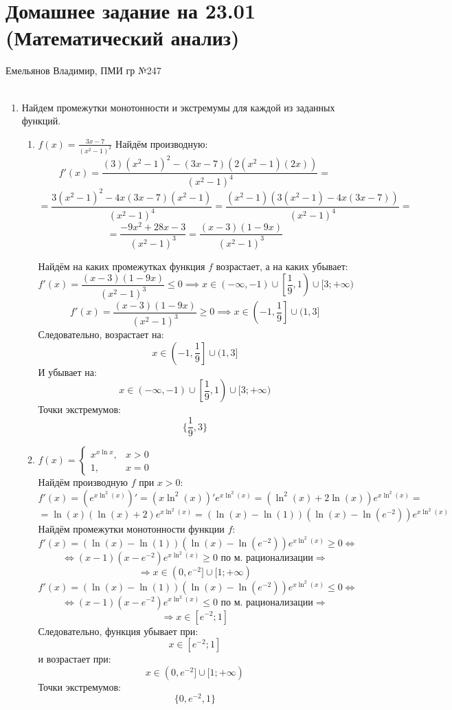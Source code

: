\documentclass[a4paper]{article}
\renewcommand{\f}[2]{\frac{#1}{#2}}
\newcommand{\lr}{\Leftrightarrow}
\renewcommand{\r}{\Rightarrow}
\renewcommand{\geq}{\geqslant}
\renewcommand{\leq}{\leqslant}
\begin{document}
\section*{Домашнее задание на 23.01 (Математический анализ)}
 {\large Емельянов Владимир, ПМИ гр №247}\\\\
\begin{enumerate}
    \item[\textbf{№1}]Найдем промежутки монотонности и экстремумы для каждой из заданных функций.
    \begin{enumerate}
        \item[(a)]$ f(x) = \frac{3x - 7}{(x^2 - 1)^2} $
        Найдём производную:
        $$
        f'(x) = \frac{(3)(x^2 - 1)^2 - (3x - 7)(2(x^2 - 1)(2x))}{(x^2 - 1)^4} =
        $$
        $$
        = \frac{3(x^2 - 1)^2 - 4x(3x - 7)(x^2 - 1)}{(x^2 - 1)^4} = \frac{(x^2 - 1)(3(x^2 - 1) - 4x(3x - 7))}{(x^2 - 1)^4} =
        $$
        $$
        =\frac{-9x^2 +28x-3}{(x^2 - 1)^3} = \frac{(x-3)(1-9x)}{(x^2 - 1)^3}
        $$

        Найдём на каких промежутках функция $f$ возрастает, а на каких убывает:
        $$
        f'(x) = \frac{(x-3)(1-9x)}{(x^2 - 1)^3} \leq 0 \implies  x \in (-\infty, -1) \cup \left[\frac{1}{9}, 1\right) \cup [3;+\infty)
        $$
        $$
        f'(x) = \frac{(x-3)(1-9x)}{(x^2 - 1)^3} \geq 0 \implies x \in \left(\left.-1, \frac{1}{9}\right]\right. \cup (1, 3]
        $$
        Следовательно, возрастает на:
        $$x \in \left(\left.-1, \frac{1}{9}\right]\right. \cup (1, 3]$$
        И убывает на:
        $$x \in (-\infty, -1) \cup \left[\frac{1}{9}, 1\right) \cup [3;+\infty)$$
        Точки экстремумов:
        $$\{\f{1}{9}, 3\}$$

        \item[(b)] $ f(x) = \begin{cases} x^{x \ln x}, & x > 0 \\ 1, & x = 0 \end{cases} $\\
        
        Найдём производную $f$ при $x>0$:
        $$f'(x) = (e^{x\ln^2(x)})' = (x\ln^2(x))'e^{x\ln^2(x)} = (\ln^2(x)+2\ln(x))e^{x\ln^2(x)} = $$
        $$= \ln(x)(\ln(x)+2)e^{x\ln^2(x)} = (\ln(x)-\ln(1))(\ln(x)-\ln(e^{-2}))e^{x\ln^2(x)}$$
        Найдём промежутки монотонности функции $f$:
        $$f'(x) = (\ln(x)-\ln(1))(\ln(x)-\ln(e^{-2}))e^{x\ln^2(x)} \geq 0 \lr$$
        $$\lr(x-1)(x-e^{-2})e^{x\ln^2(x)}\geq 0\text{ по м. рационализации} \r$$
        $$\r x\in (0,e^{-2}] \cup [1; +\infty)$$
        $$f'(x) = (\ln(x)-\ln(1))(\ln(x)-\ln(e^{-2}))e^{x\ln^2(x)} \leq 0 \lr$$
        $$\lr(x-1)(x-e^{-2})e^{x\ln^2(x)}\leq 0\text{ по м. рационализации} \r$$
        $$\r x\in [e^{-2};1]$$
        Следовательно, функция убывает при:
        $$x\in [e^{-2};1]$$
        и возрастает при:
        $$x\in (0,e^{-2}] \cup [1; +\infty)$$
        Точки экстремумов:
        $$\{0, e^{-2}, 1\}$$\\
    \end{enumerate}


\end{enumerate}
\end{document}
